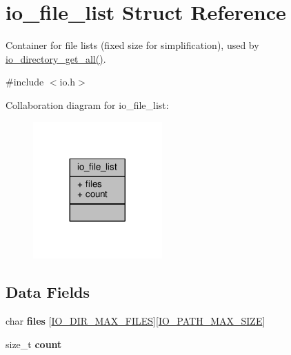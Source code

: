 \hypertarget{structio__file__list}{}\section{io\+\_\+file\+\_\+list Struct Reference}
\label{structio__file__list}


Container for file lists (fixed size for simplification), used by \hyperlink{io_8c_adb8d68b54b043f5118a4cbfd49a8ec51}{io\+\_\+directory\+\_\+get\+\_\+all()}.  




{\ttfamily \#include $<$io.\+h$>$}



Collaboration diagram for io\+\_\+file\+\_\+list\+:\nopagebreak
\begin{figure}[H]
\begin{center}
\leavevmode
\includegraphics[width=140pt]{structio__file__list__coll__graph}
\end{center}
\end{figure}
\subsection*{Data Fields}
\begin{DoxyCompactItemize}
\item 
char {\bfseries files} \mbox{[}\hyperlink{io_8h_a467d28fd66a94e856cb73b80110d730a}{I\+O\+\_\+\+D\+I\+R\+\_\+\+M\+A\+X\+\_\+\+F\+I\+L\+ES}\mbox{]}\mbox{[}\hyperlink{io_8h_a3459a8a15f99dc120380d828bc7a4cd8}{I\+O\+\_\+\+P\+A\+T\+H\+\_\+\+M\+A\+X\+\_\+\+S\+I\+ZE}\mbox{]}\hypertarget{structio__file__list_aea2e7d487e7a0ce1737212bb7679dbcc}{}\label{structio__file__list_aea2e7d487e7a0ce1737212bb7679dbcc}

\item 
size\+\_\+t {\bfseries count}\hypertarget{structio__file__list_a76d971a3c552bc58ba9f0d5fceae9806}{}\label{structio__file__list_a76d971a3c552bc58ba9f0d5fceae9806}

\end{DoxyCompactItemize}


